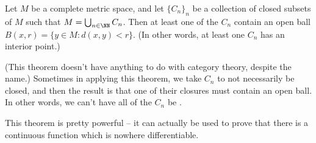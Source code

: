 \begin{theorem}
Let $M$ be a complete metric space, and let $\{C_n\}_n$ be a collection of closed subsets of $M$ such that $M = \bigcup_{n\in\NN} C_n$. Then at least one of the $C_n$ contain an open ball $B(x, r) = \{y \in M: d(x, y) < r\}$. (In other words, at least one $C_n$ has an interior point.)
\end{theorem}

(This theorem doesn't have anything to do with category theory, despite the name.) Sometimes in applying this theorem, we take $C_n$ to not necessarily be closed, and then the result is that one of their closures must contain an open ball. In other words, we can't have all of the $C_n$ be .

\begin{remark}
This theorem is pretty powerful -- it can actually be used to prove that there is a continuous function which is nowhere differentiable.
\end{remark}

